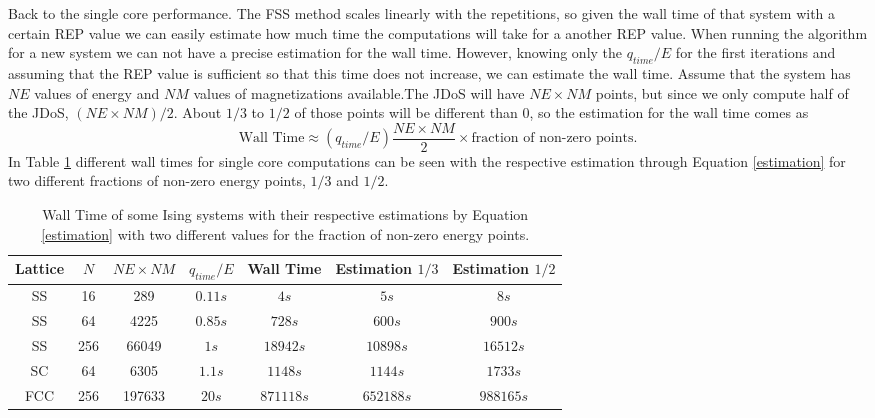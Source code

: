Back to the single core performance. The FSS method scales linearly with the repetitions, so given the wall time of that system with a certain REP value we can easily estimate how much time the computations will take for a another REP value.
When running the algorithm for a new system we can not have a precise estimation for the wall time. However, knowing only the $q_{time}/E$ for the first iterations and assuming that the REP value is sufficient so that this time does not increase, we can estimate the wall time. Assume that the system has $NE$ values of energy and $NM$ values of magnetizations available.The JDoS will have $NE \times NM$ points, but since we only compute half of the JDoS, $( NE \times NM ) / 2$. About $1/3$ to $1/2$ of those points will be different than 0, so the estimation for the wall time comes as 
\begin{equation}\label{estimation}
	\text{Wall Time} \approx (q_{time}/E) \frac{NE \times NM}{2} \times \text{fraction of non-zero points} .
\end{equation}
In Table \ref{wall_time_table} different wall times for single core computations can be seen with the respective estimation through Equation \ref{estimation} for two different fractions of non-zero energy points, $1/3$ and $1/2$. 

\begin{table}[h]
\centering
\caption{Wall Time of some Ising systems with their respective estimations by Equation \ref{estimation} with two different values for the fraction of non-zero energy points.} 
\begin{tabular}{c|c|c|c|c|c|c}
Lattice & $N$   & $NE \times NM$ & $q_{time}/E$ & Wall Time & Estimation $1/3$ & Estimation $1/2$ \\ \hline
SS      & 16  & 289                         & $0.11s $        & $4s$        &$ 5s$                  & $8s$                  \\
SS      & 64  & 4225                        & $0.85s$         & $728s$      & $600s $               & $900s    $ \\
SS      & 256 & 66049                       & $1s$            & $18942s$    & $10898s $             & $16512s  $ \\
SC      & 64  & 6305                        & $1.1s $         & $1148s$     & $1144s$              & $1733s $           \\
FCC     & 256 & 197633                      & $20s$           &$ 871118s$   & $652188s$      & $988165s$            
\end{tabular}
\label{wall_time_table}
\end{table}

